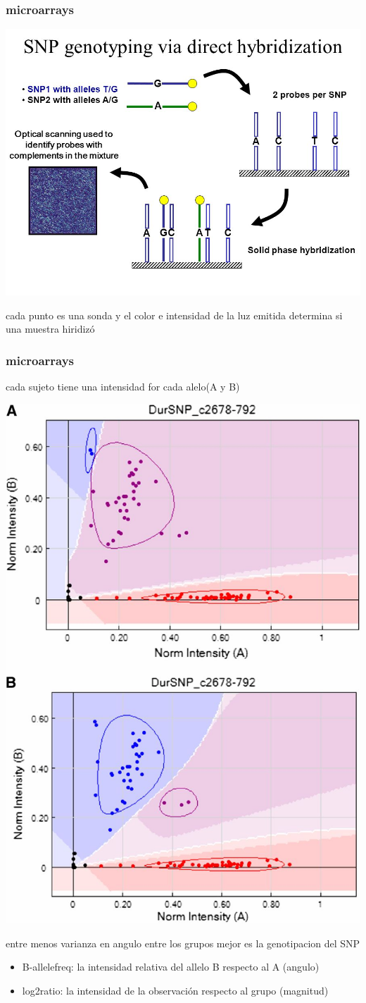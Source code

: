 \documentclass{beamer}\usepackage[]{graphicx}\usepackage[]{color}
\begin{document}
\begin{frame}[fragile] 
\frametitle{microarrays}

\includegraphics[width=0.8\linewidth]{micro2.jpg}

cada punto es una sonda y el color e intensidad de la luz emitida determina si una muestra hiridiz\'o 

\end{frame}

\begin{frame}[fragile] 
\frametitle{microarrays}

cada sujeto tiene una intensidad for cada alelo(A y B)
\begin{center}
\includegraphics[width=0.3\linewidth]{clustermicro.jpg}
\end{center}
entre menos varianza en angulo entre los grupos mejor es la genotipacion del SNP

\begin{itemize}
\item B-allelefreq: la intensidad relativa del allelo B respecto al A (angulo)
\item log2ratio: la intensidad de la observaci\'on respecto al grupo (magnitud)
\end{itemize}
\end{frame}
\end{document}
